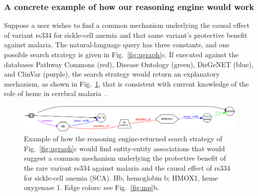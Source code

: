 \documentclass[11pt,notitlepage]{article}
\begin{document}
\subsubsection{A concrete example of how our reasoning engine would work}
Suppose a user wishes to find a common mechanism %
underlying the causal effect of variant rs334 for sickle-cell anemia and that
same variant's protective benefit against malaria. The natural-language query
has three constants, %
and one possible search strategy is given in 
 Fig.~\ref{fig:ugraph}c. If executed against the
databases Pathway Commons (red), Disease Ontology (green), DisGeNET (blue), and
ClinVar (purple), the search strategy would return an explanatory mechanism, as
shown in Fig.~\ref{fig:malaria}, that is consistent with current knowledge of
the role of heme in cerebral malaria~\cite{Ferreira:2011ff}.
\begin{figure}[htbp]
  \begin{center}
    \includegraphics[width=6in]{net5.png}
  \end{center}
    \caption{Example of how the reasoning engine-returned search strategy of
      Fig.~\ref{fig:ugraph}c would find entity-entity associations that would
      suggest a common mechanism underlying the protective benefit of the rare
      variant rs334 against malaria and the causal effect of rs334 for
      sickle-cell anemia (SCA). Hb, hemoglobin b; HMOX1, heme
      oxygenase 1.  Edge colors: see Fig.~\ref{fig:mp}b.}
  \label{fig:malaria}
\end{figure}
\vspace{-2ex}
\end{document}
